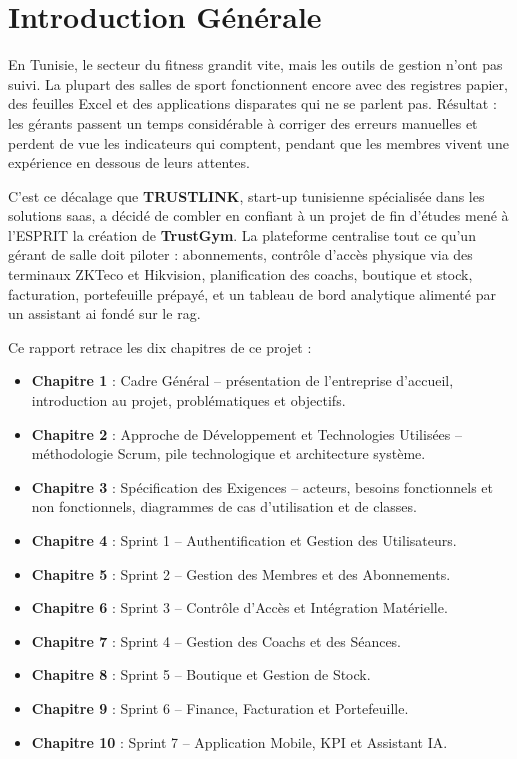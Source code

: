 \documentclass[../main.tex]{subfiles}
\begin{document}
\newpage
{}
\section*{Introduction G\'{e}n\'{e}rale}
En Tunisie, le secteur du fitness grandit vite, mais les outils de gestion n'ont pas suivi. La plupart des salles de sport fonctionnent encore avec des registres papier, des feuilles Excel et des applications disparates qui ne se parlent pas. R\'{e}sultat : les g\'{e}rants passent un temps consid\'{e}rable \`{a} corriger des erreurs manuelles et perdent de vue les indicateurs qui comptent, pendant que les membres vivent une exp\'{e}rience en dessous de leurs attentes.

C'est ce d\'{e}calage que \textbf{TRUSTLINK}, start-up tunisienne sp\'{e}cialis\'{e}e dans les solutions \acrshort{saas}, a d\'{e}cid\'{e} de combler en confiant \`{a} un projet de fin d'\'{e}tudes men\'{e} \`{a} l'ESPRIT la cr\'{e}ation de \textbf{TrustGym}. La plateforme centralise tout ce qu'un g\'{e}rant de salle doit piloter : abonnements, contr\^{o}le d'acc\`{e}s physique via des terminaux ZKTeco et Hikvision, planification des coachs, boutique et stock, facturation, portefeuille pr\'{e}pay\'{e}, et un tableau de bord analytique aliment\'{e} par un assistant \acrshort{ai} fond\'{e} sur le \acrshort{rag}.

Ce rapport retrace les dix chapitres de ce projet :
\begin{itemize}
  \item \textbf{Chapitre 1} : Cadre G\'{e}n\'{e}ral -- pr\'{e}sentation de l'entreprise d'accueil, introduction au projet, probl\'{e}matiques et objectifs.
  \item \textbf{Chapitre 2} : Approche de D\'{e}veloppement et Technologies Utilis\'{e}es -- m\'{e}thodologie Scrum, pile technologique et architecture syst\`{e}me.
  \item \textbf{Chapitre 3} : Sp\'{e}cification des Exigences -- acteurs, besoins fonctionnels et non fonctionnels, diagrammes de cas d'utilisation et de classes.
  \item \textbf{Chapitre 4} : Sprint 1 -- Authentification et Gestion des Utilisateurs.
  \item \textbf{Chapitre 5} : Sprint 2 -- Gestion des Membres et des Abonnements.
  \item \textbf{Chapitre 6} : Sprint 3 -- Contr\^{o}le d'Acc\`{e}s et Int\'{e}gration Mat\'{e}rielle.
  \item \textbf{Chapitre 7} : Sprint 4 -- Gestion des Coachs et des S\'{e}ances.
  \item \textbf{Chapitre 8} : Sprint 5 -- Boutique et Gestion de Stock.
  \item \textbf{Chapitre 9} : Sprint 6 -- Finance, Facturation et Portefeuille.
  \item \textbf{Chapitre 10} : Sprint 7 -- Application Mobile, KPI et Assistant IA.
\end{itemize}
\end{document}
